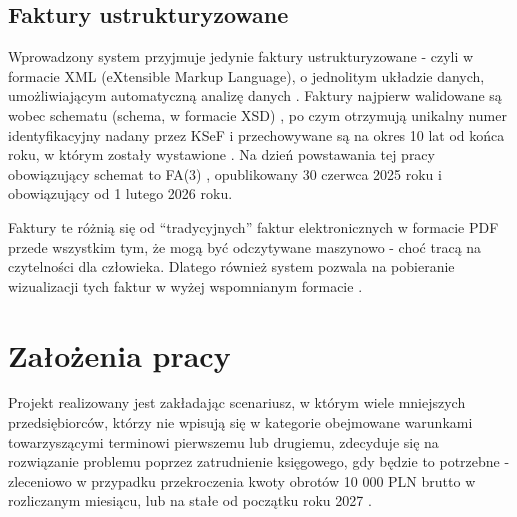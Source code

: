 \subsection{Faktury ustrukturyzowane}
Wprowadzony system przyjmuje jedynie faktury ustrukturyzowane - czyli w formacie XML (eXtensible Markup Language), o jednolitym układzie danych, umożliwiającym automatyczną analizę danych \parencite{structured_invoice_2025}. Faktury najpierw walidowane są wobec schematu (schema, w formacie XSD) \parencite{structured_invoice_2025}, po czym otrzymują unikalny numer identyfikacyjny nadany przez KSeF i przechowywane są na okres 10 lat od końca roku, w którym zostały wystawione \parencite{ministerstwo_finansow_pytania_2025}. Na dzień powstawania tej pracy obowiązujący schemat to FA(3) \parencite{structured_invoice_2025}, opublikowany 30 czerwca 2025 roku i obowiązujący od 1 lutego 2026 roku.

Faktury te różnią się od \enquote{tradycyjnych} faktur elektronicznych w formacie PDF przede wszystkim tym, że mogą być odczytywane maszynowo - choć tracą na czytelności dla człowieka. Dlatego również system pozwala na pobieranie wizualizacji tych faktur w wyżej wspomnianym formacie \parencite{structured_invoice_2025}.

\section{Założenia pracy}
Projekt realizowany jest zakładając scenariusz, w którym wiele mniejszych przedsiębiorców, którzy nie wpisują się w kategorie obejmowane warunkami towarzyszącymi terminowi pierwszemu lub drugiemu, zdecyduje się na rozwiązanie problemu poprzez zatrudnienie księgowego, gdy będzie to potrzebne - zleceniowo w przypadku przekroczenia kwoty obrotów 10 000 PLN brutto w rozliczanym miesiącu, lub na stałe od początku roku 2027 \parencite{ministerstwo_finansow_zakres_2025}. 

